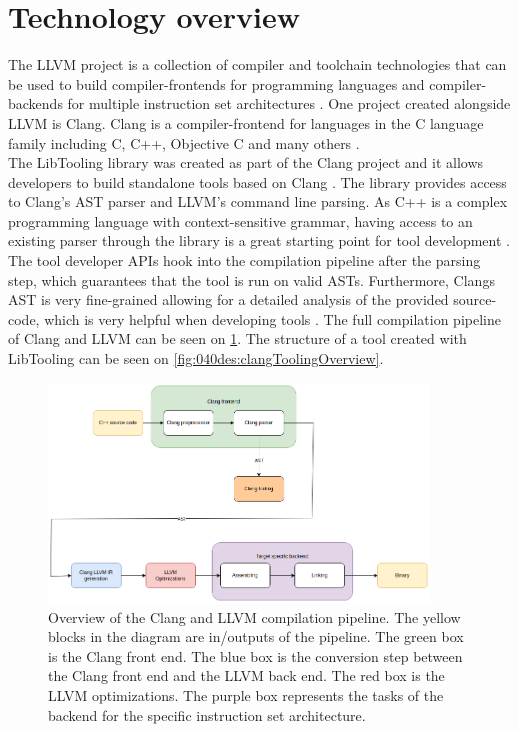 \section{Technology overview}
The LLVM project is a collection of compiler and toolchain technologies that can be used to build compiler-frontends for programming languages and compiler-backends for multiple instruction set architectures \cite{llvmLLVMCompilerInfrastructure}.
One project created alongside LLVM is Clang. Clang is a compiler-frontend for languages in the C language family including C, C++, Objective C and many others \cite{clangClangLanguageFamily}.\\
The LibTooling library was created as part of the Clang project and it allows developers to build standalone tools based on Clang \cite{llvmLibToolingClang17}. 
The library provides access to Clang's AST parser and LLVM's command line parsing. As C++ is a complex programming language with context-sensitive grammar, having access to an existing parser through the library is a great starting point for tool development \cite{swarnimProblemsPainsParsing}. The tool developer APIs hook into the compilation pipeline after the parsing step, which guarantees that the tool is run on valid ASTs. Furthermore, Clangs AST is very fine-grained allowing for a detailed analysis of the provided source-code, which is very helpful when developing tools \cite{clangIntroductionClangAST}. The full compilation pipeline of Clang and LLVM can be seen on \cref{fig:040des:llvmToolchainOverview}. The structure of a tool created with LibTooling can be seen on \cref{fig:040des:clangToolingOverview}.

\begin{figure}[H]
    \centering
    \includegraphics[width=0.9\textwidth]{figs/040des/compilation_overview.png}
    \caption{Overview of the Clang and LLVM compilation pipeline. The yellow blocks in the diagram are in/outputs of the pipeline. The green box is the Clang front end. The blue box is the conversion step between the Clang front end and the LLVM back end. The red box is the LLVM optimizations. The purple box represents the tasks of the backend for the specific instruction set architecture.}
    \label{fig:040des:llvmToolchainOverview}
\end{figure}

